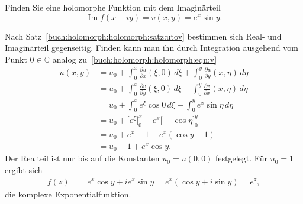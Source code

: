Finden Sie eine holomorphe Funktion mit dem Imaginärteil
\[
\operatorname{Im}f(x+iy)
=
v(x,y)
=
e^x\sin y.
\]

\begin{loesung}
Nach Satz~\ref{buch:holomorph:holomorph:satz:utov} bestimmen sich
Real- und Imaginärteil gegenseitig.
Finden kann man ihn durch Integration ausgehend vom Punkt $0\in\mathbb{C}$
analog zu~\eqref{buch:holomorph:holomorph:eqn:v}
\begin{align*}
u(x,y)
&=
u_0
+
\int_0^x \frac{\partial u}{\partial x}(\xi,0)\,d\xi
+
\int_0^y \frac{\partial u}{\partial y}(x,\eta)\,d\eta
\\
&=
u_0
+
\int_0^x \frac{\partial v}{\partial y}(\xi,0)\,d\xi
-
\int_0^y \frac{\partial v}{\partial x}(x,\eta)\,d\eta
\\
&=
u_0
+
\int_0^x
e^\xi\cos 0
\,d\xi
-
\int_0^y
e^x\sin \eta
\,d\eta
\\
&=
u_0
+
\bigl[
e^\xi
\bigr]_0^x
-
e^x
\bigl[
-\cos\eta
\bigr]_0^y
\\
&=
u_0
+
e^x
-
1
+
e^x
(
\cos y
-
1
)
\\
&=
u_0
-
1
+
e^x\cos y.
\end{align*}
Der Realteil ist nur bis auf die Konstanten $u_0=u(0,0)$ festgelegt.
Für $u_0=1$ ergibt sich
\begin{align*}
f(z)
&=
e^x \cos y + ie^x \sin y
=
e^x (\cos y + i\sin y)
=
e^z,
\end{align*}
die komplexe Exponentialfunktion.
\end{loesung}

